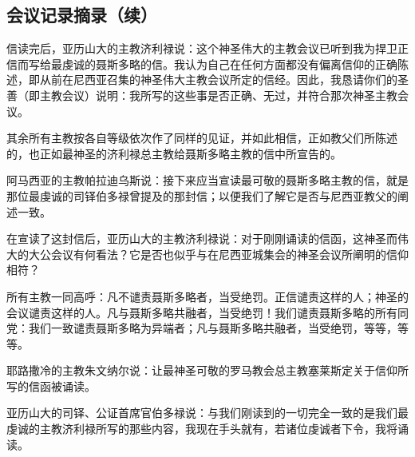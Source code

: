 
\subsection{会议记录摘录（续）}

信读完后，亚历山大的主教济利禄说：这个神圣伟大的主教会议已听到我为捍卫正信而写给最虔诚的聂斯多略的信。我认为自己在任何方面都没有偏离信仰的正确陈述，即从前在尼西亚召集的神圣伟大主教会议所定的信经。因此，我恳请你们的圣善（即主教会议）说明：我所写的这些事是否正确、无过，并符合那次神圣主教会议。\par

\par

其余所有主教按各自等级依次作了同样的见证，并如此相信，正如教父们所陈述的，也正如最神圣的济利禄总主教给聂斯多略主教的信中所宣告的。\par

阿马西亚的主教帕拉迪乌斯说：接下来应当宣读最可敬的聂斯多略主教的信，就是那位最虔诚的司铎伯多禄曾提及的那封信；以便我们了解它是否与尼西亚教父的阐述一致。\par

在宣读了这封信后，亚历山大的主教济利禄说：对于刚刚诵读的信函，这神圣而伟大的大公会议有何看法？它是否也似乎与在尼西亚城集会的神圣会议所阐明的信仰相符？\par

\par

所有主教一同高呼：凡不谴责聂斯多略者，当受绝罚。正信谴责这样的人；神圣的会议谴责这样的人。凡与聂斯多略共融者，当受绝罚！我们谴责聂斯多略的所有同党：我们一致谴责聂斯多略为异端者；凡与聂斯多略共融者，当受绝罚，等等，等等。\par

耶路撒冷的主教朱文纳尔说：让最神圣可敬的罗马教会总主教塞莱斯定关于信仰所写的信函被诵读。\par

\par

亚历山大的司铎、公证首席官伯多禄说：与我们刚读到的一切完全一致的是我们最虔诚的主教济利禄所写的那些内容，我现在手头就有，若诸位虔诚者下令，我将诵读。\par


